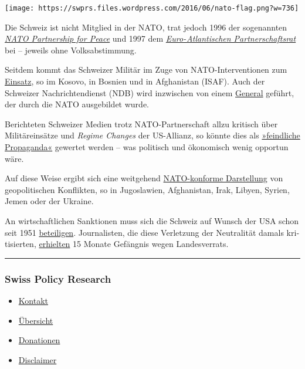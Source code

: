 \texttt{[image: https://swprs.files.wordpress.com/2016/06/nato-flag.png?w=736]}

Die Schweiz ist nicht Mitglied in der NATO, trat jedoch 1996 der
sogenannten \emph{\href{http://www.pfp.admin.ch/}{NATO Partnership for
Peace}} und 1997 dem
\emph{\href{http://www.nato.int/docu/review/2007/issue2/german/art5.html}{Euro- Atlan­tischen
Part­ner­­schafts­­­rat}} bei -- jeweils ohne Volks­ab­stimmung.

Seit­dem kommt das Schweizer Militär im Zuge von NATO-Inter­­ven­­tionen
zum \href{https://www.peace-support.ch/de/}{Einsatz}, so im Kosovo, in
Bosnien und in Afgha­ni­stan (ISAF). Auch der Schweizer
Nach­richten­dienst (NDB) wird inzwischen von einem
\href{https://www.admin.ch/gov/de/start/dokumentation/medienmitteilungen.msg-id-70400.html}{General}
geführt, der durch die NATO ausgebildet wurde.

Berichteten Schweizer Medien trotz NATO-Part­ner­schaft allzu kritisch
über Militär­ein­sätze und \emph{Re­gime Changes} der US-Allianz, so
könnte dies als
\href{https://swprs.org/russische-propaganda/}{»feind­li­che
Pro­pa­gan­da«} ge­wer­tet werden -- was po­li­tisch und ökonomisch
wenig opportun wäre.

Auf diese Weise ergibt sich eine weitgehend
\href{https://swprs.org/medien-navigator/}{NATO-kon­forme Darstellung}
von geopolitischen Kon­flik­ten, so in Jugoslawien, Afgha­ni­stan, Irak,
Li­by­en, Syrien, Jemen oder der Ukraine.

An wirtschaftlichen Sanktionen muss sich die Schweiz auf Wunsch der USA
schon seit 1951
\href{https://de.wikipedia.org/wiki/Hotz-Linder-Agreement}{be­tei­li­gen}.
Jour­na­listen, die diese Ver­letzung der Neu­tra­lität damals
kri­ti­sierten,
\href{https://web.archive.org/web/20141206061445/http://buchundnetz.com/online-buch/schnueffelstaat-schweiz-ob/iii-modernisieren-oder-abschaffen/staatsschutz-je-nach-wetterlage/}{er­hielten}
15 Mo­nate Gefäng­nis wegen Landes­verrats.

\begin{center}\rule{0.5\linewidth}{\linethickness}\end{center}

\hypertarget{swiss-policy-research}{%
\subsubsection{Swiss Policy Research}\label{swiss-policy-research}}

\begin{itemize}
\tightlist
\item
  \href{https://swprs.org/kontakt/}{Kontakt}
\item
  \href{https://swprs.org/uebersicht/}{Übersicht}
\item
  \href{https://swprs.org/donationen/}{Donationen}
\item
  \href{https://swprs.org/disclaimer/}{Disclaimer}
\end{itemize}

